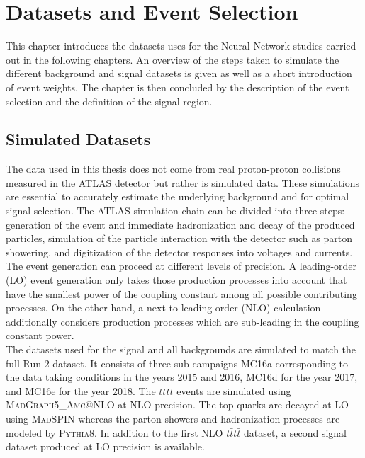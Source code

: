 \chapter{Datasets and Event Selection}
\label{sec:Samples}
This chapter introduces the datasets uses for the Neural Network studies carried out in the following chapters. An overview of the steps taken to simulate the different background and signal datasets is given as well as a short introduction of event weights. The chapter is then concluded by the description of the event selection and the definition of the signal region.

\section{Simulated Datasets}
\label{sec:Simulation}
The data used in this thesis does not come from real proton-proton collisions measured in the ATLAS detector but rather is simulated data. These simulations are essential to accurately estimate the underlying background and for optimal signal selection. The ATLAS simulation chain \cite{ATLASsim} can be divided into three steps: generation of the event and immediate hadronization and decay of the produced particles, simulation of the particle interaction with the detector such as parton showering,  and digitization of the detector responses into voltages and currents. The event generation can proceed at different levels of precision. A leading-order (LO) event generation only takes those production processes into account that have the smallest power of the coupling constant among all possible contributing processes. On the other hand, a next-to-leading-order (NLO) calculation additionally considers production processes which are sub-leading in the coupling constant power.  \\
The datasets used for the signal and all backgrounds are simulated to match the full Run 2 dataset. It consists of three sub-campaigns MC16a corresponding to the data taking conditions in the years 2015 and 2016, MC16d for the year 2017, and MC16e for the year 2018. The $t\bar{t}t\bar{t}$ events are simulated using {\scshape MadGraph5\_Amc@NLO} \cite{MadGraph} at NLO precision. The top quarks are decayed at LO using {\scshape MadSPIN} whereas the parton showers and hadronization processes are modeled by {\scshape Pythia8}\cite{PYTHIA}. In addition to the first NLO $t\bar{t}t\bar{t}$ dataset, a second signal dataset produced at LO precision is available. \\
